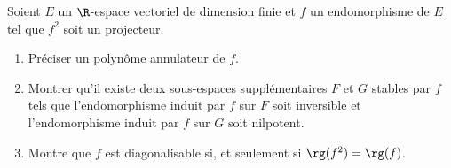 \begin{enonce}
\begin{exercise}[ID={RMS133 E692},subtitle={Mines-Ponts PSI 2022},tags={},difficulty={}]
Soient $E$ un $\R$-espace vectoriel de dimension finie et $f$ un endomorphisme de $E$ tel que $f^2$ soit un projecteur.
\begin{enumerate}
  \item Préciser un polynôme annulateur de $f$.
  \item Montrer qu'il existe deux sous-espaces supplémentaires $F$ et $G$ stables par $f$ tels que l'endomorphisme induit par $f$ sur $F$ soit inversible et l'endomorphisme induit par $f$ sur $G$ soit nilpotent.
  \item Montre que $f$ est diagonalisable si, et seulement si $\rg(f^2) = \rg(f)$.
\end{enumerate}
\end{exercise}
\begin{solution}
\end{solution}
\end{enonce}
